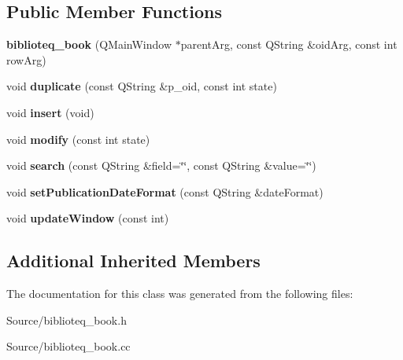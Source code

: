 \subsection*{Public Member Functions}
\begin{DoxyCompactItemize}
\item 
{\bfseries biblioteq\+\_\+book} (Q\+Main\+Window $\ast$parent\+Arg, const Q\+String \&oid\+Arg, const int row\+Arg)\hypertarget{classbiblioteq__book_a9c49be1b86b1271b29c62ac080c7d690}{}\label{classbiblioteq__book_a9c49be1b86b1271b29c62ac080c7d690}

\item 
void {\bfseries duplicate} (const Q\+String \&p\+\_\+oid, const int state)\hypertarget{classbiblioteq__book_a94e9438ea4efeb2b09655868528a0e66}{}\label{classbiblioteq__book_a94e9438ea4efeb2b09655868528a0e66}

\item 
void {\bfseries insert} (void)\hypertarget{classbiblioteq__book_af6bc97dae293a25690f436c3c3909b8d}{}\label{classbiblioteq__book_af6bc97dae293a25690f436c3c3909b8d}

\item 
void {\bfseries modify} (const int state)\hypertarget{classbiblioteq__book_a89e33d0067a5970384d3ae2215f4e691}{}\label{classbiblioteq__book_a89e33d0067a5970384d3ae2215f4e691}

\item 
void {\bfseries search} (const Q\+String \&field=\char`\"{}\char`\"{}, const Q\+String \&value=\char`\"{}\char`\"{})\hypertarget{classbiblioteq__book_a9fc5c29f9a288cc220708843f454cb3b}{}\label{classbiblioteq__book_a9fc5c29f9a288cc220708843f454cb3b}

\item 
void {\bfseries set\+Publication\+Date\+Format} (const Q\+String \&date\+Format)\hypertarget{classbiblioteq__book_a0fe820b8616f9cb6b441f47d7189aeed}{}\label{classbiblioteq__book_a0fe820b8616f9cb6b441f47d7189aeed}

\item 
void {\bfseries update\+Window} (const int)\hypertarget{classbiblioteq__book_a472b0af8e34398364f759b1af9c6b239}{}\label{classbiblioteq__book_a472b0af8e34398364f759b1af9c6b239}

\end{DoxyCompactItemize}
\subsection*{Additional Inherited Members}


The documentation for this class was generated from the following files\+:\begin{DoxyCompactItemize}
\item 
Source/biblioteq\+\_\+book.\+h\item 
Source/biblioteq\+\_\+book.\+cc\end{DoxyCompactItemize}
